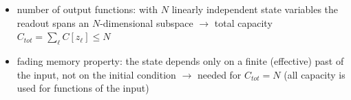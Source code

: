 \begin{itemize}
\begin{itemize}
        $\to$ capacities of an orthonormal basis $\{z_\ell\}$ can be summed without double counting
        \item basis: products of orthogonal polynomials (Legendre for uniform $u$) of the delayed inputs
        $\to$ split into degrees (linear memory, nonlinear parts); this is what \texttt{qrc/ipc.py} uses
    \end{itemize}
    \item number of output functions: with $N$ linearly independent state variables the readout spans an
    $N$-dimensional subspace $\to$ total capacity $C_{tot} = \sum_\ell C[z_\ell] \le N$
    \item fading memory property: the state depends only on a finite (effective) past of the input, not on
    the initial condition $\to$ needed for $C_{tot} = N$ (all capacity is used for functions of the input)
\end{itemize}
